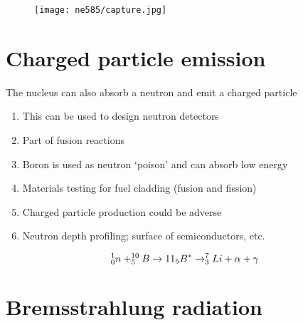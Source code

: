 \documentclass[aspectratio=1610,pdftex,dvipsnames,compress,xcolor={dvipsnames}]{beamer}
\begin{document}
\begin{frame}{}
    \begin{figure}
        \centering
        \texttt{[image: ne585/capture.jpg]}
    \end{figure}
\end{frame}


\section{Charged particle emission}


\addtocounter{framenumber}{-1} 
\begin{frame}{The nucleus can also absorb a neutron and emit a charged particle}
    \begin{enumerate}[series=outerlist,topsep=0pt,itemsep=21pt,leftmargin=*,label=(\arabic*)]
        \item[]This can be used to design neutron detectors
        \item[]Part of fusion reactions
        \item[]Boron is used as neutron `poison' and can absorb low energy 
        \item[]Materials testing for fuel cladding (fusion and fission)
        \item[]Charged particle production could be adverse
        \item[]Neutron depth profiling; surface of semiconductors, etc.
    \end{enumerate}

    \vspace*{\fill}

    \begin{equation}
        \LARGE
        ^{1}_{0}n + ^{10}_{5}B \rightarrow {11}_{5}B^{*} \rightarrow ^{7}_{3}Li + \alpha + \gamma
    \end{equation}

\end{frame}


\section{Bremsstrahlung radiation}
\end{document}
